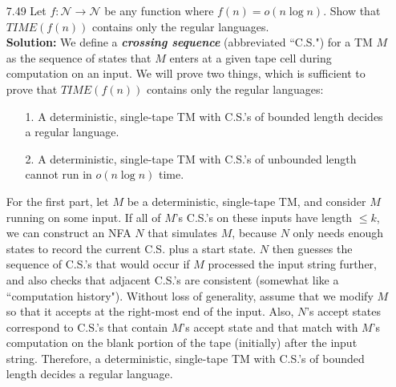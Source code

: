 \begin{enumerate}
\item[7.49]Let $f: \mathcal{N} \rightarrow \mathcal{N}$ be any function where $f(n) = o(n \log n)$. Show that $TIME(f(n))$ contains only the regular languages.
\\
\textbf{Solution:} We define a \textbf{\emph{crossing sequence}} (abbreviated ``C.S.") for a TM $M$ as the sequence of states that $M$ enters at a given tape cell during computation on an input. We will prove two things, which is sufficient to prove that $TIME(f(n))$ contains only the regular languages:
\begin{enumerate}
\item[1.]A deterministic, single-tape TM with C.S.'s of bounded length decides a regular language.
\item[2.]A deterministic, single-tape TM with C.S.'s of unbounded length cannot run in $o(n \log n)$ time. 
\end{enumerate}

\par For the first part, let $M$ be a deterministic, single-tape TM, and consider $M$ running on some input. If all of $M$'s C.S.'s on these inputs have length $\le k$, we can construct an NFA $N$ that simulates $M$, because $N$ only needs enough states to record the current C.S. plus a start state. $N$ then guesses the sequence of C.S.'s that would occur if $M$ processed the input string further, and also checks that adjacent C.S.'s are consistent (somewhat like a ``computation history"). Without loss of generality, assume that we modify $M$ so that it accepts at the right-most end of the input. Also, $N$'s accept states correspond to C.S.'s that contain $M$'s accept state and that match with $M$'s computation on the blank portion of the tape (initially) after the input string. Therefore, a deterministic, single-tape TM with C.S.'s of bounded length decides a regular language.


\end{enumerate}

